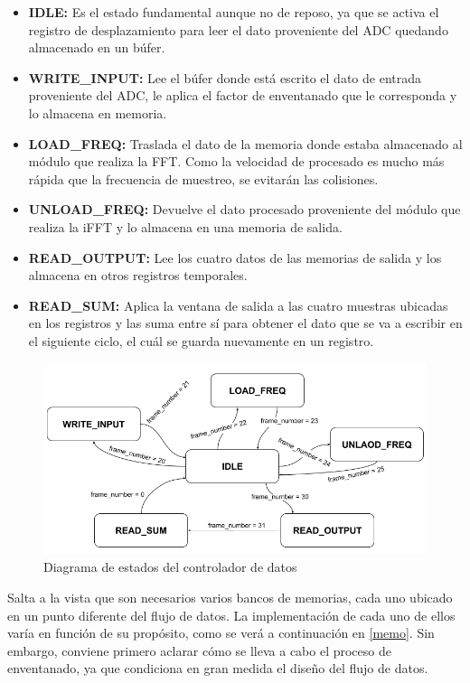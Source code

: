 \begin{itemize}
\item \textbf{IDLE:} Es el estado fundamental aunque no de reposo, ya que se activa el registro de desplazamiento para leer el dato proveniente del ADC quedando almacenado en un búfer.
\item \textbf{WRITE\_INPUT:} Lee el búfer donde está escrito el dato de entrada proveniente del ADC, le aplica el factor de enventanado que le corresponda y lo almacena en memoria.
\item \textbf{LOAD\_FREQ:} Traslada el dato de la memoria donde estaba almacenado al módulo que realiza la FFT. Como la velocidad de procesado es mucho más rápida que la frecuencia de muestreo, se evitarán las colisiones.
\item \textbf{UNLOAD\_FREQ:} Devuelve el dato procesado proveniente del módulo que realiza la iFFT y lo almacena en una memoria de salida.
\item \textbf{READ\_OUTPUT:} Lee los cuatro datos de las memorias de salida y los almacena en otros registros temporales.
\item \textbf{READ\_SUM:} Aplica la ventana de salida a las cuatro muestras ubicadas en los registros y las suma entre sí para obtener el dato que se va a escribir en el siguiente ciclo, el cuál se guarda nuevamente en un registro.
\end{itemize}

\begin{figure}[!th]
\begin{center}
\includegraphics[width=13cm]{img/destados.png}
\caption{\label{fig:estados}Diagrama de estados del controlador de datos}
\end{center}
\end{figure}

Salta a la vista que son necesarios varios bancos de memorias, cada uno ubicado en un punto diferente del flujo de datos. La implementación de cada uno de ellos varía en función de su propósito, como se verá a continuación en \ref{memo}. Sin embargo, conviene primero aclarar cómo se lleva a cabo el proceso de enventanado, ya que condiciona en gran medida el diseño del flujo de datos.

